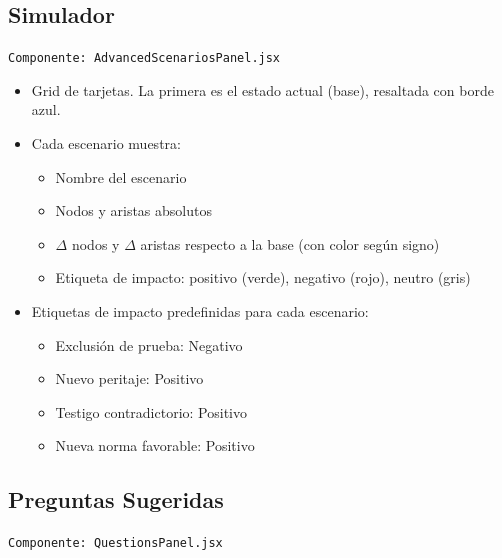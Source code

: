 \documentclass[12pt, letterpaper]{article}
\begin{document}
\subsection{Simulador}

\texttt{Componente: AdvancedScenariosPanel.jsx}

\begin{itemize}[nosep]
  \item Grid de tarjetas. La primera es el estado actual (base),
    resaltada con borde azul.
  \item Cada escenario muestra:
    \begin{itemize}[nosep]
      \item Nombre del escenario
      \item Nodos y aristas absolutos
      \item $\Delta$ nodos y $\Delta$ aristas respecto a la base
        (con color según signo)
      \item Etiqueta de impacto: positivo (verde), negativo (rojo),
        neutro (gris)
    \end{itemize}
  \item Etiquetas de impacto predefinidas para cada escenario:
    \begin{itemize}[nosep]
      \item Exclusión de prueba: Negativo
      \item Nuevo peritaje: Positivo
      \item Testigo contradictorio: Positivo
      \item Nueva norma favorable: Positivo
    \end{itemize}
\end{itemize}

\subsection{Preguntas Sugeridas}

\texttt{Componente: QuestionsPanel.jsx}
\end{document}
